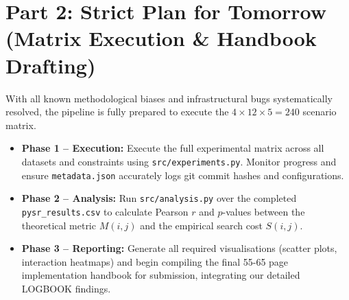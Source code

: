 \documentclass[11pt,a4paper]{article}
\begin{document}
\section*{Part 2: Strict Plan for Tomorrow (Matrix Execution \& Handbook Drafting)}

With all known methodological biases and infrastructural bugs systematically resolved, the pipeline is fully prepared to execute the $4 \times 12 \times 5 = 240$ scenario matrix.

\begin{itemize}
    \item \textbf{Phase 1 -- Execution:} Execute the full experimental matrix across all datasets and constraints using \texttt{src/experiments.py}. Monitor progress and ensure \texttt{metadata.json} accurately logs git commit hashes and configurations.
    \item \textbf{Phase 2 -- Analysis:} Run \texttt{src/analysis.py} over the completed \texttt{pysr\_results.csv} to calculate Pearson $r$ and $p$-values between the theoretical metric $M(i,j)$ and the empirical search cost $S(i,j)$.
    \item \textbf{Phase 3 -- Reporting:} Generate all required visualisations (scatter plots, interaction heatmaps) and begin compiling the final 55-65 page implementation handbook for submission, integrating our detailed LOGBOOK findings.
\end{itemize}
\end{document}

